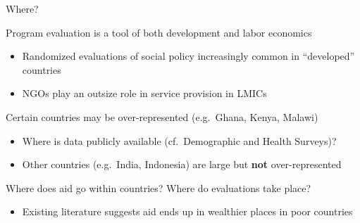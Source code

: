 \documentclass[10pt,xcolor=table,ignorenonframetext,handout,aspectratio=169]{beamer}
\newlength{\wideitemsep}
\let\olditem\item
\renewcommand{\item}{\setlength{\itemsep}{\wideitemsep}\olditem}
\begin{document}

\begin{frame}{Where?}

\medskip
Program evaluation is a tool of both development and labor economics

\medskip
\begin{itemize}
	
	\item Randomized evaluations of social policy increasingly common in ``developed'' countries
	
	\item NGOs play an outsize role in service provision in LMICs
	
\end{itemize}

\pause
\medskip
\medskip
Certain countries may be over-represented (e.g.~Ghana, Kenya, Malawi)

\medskip
\begin{itemize}
	
	\item Where is data publicly available (cf.~Demographic and Health Surveys)?
	
	\item Other countries (e.g.~India, Indonesia) are large but \textbf{not} over-represented 
	
\end{itemize}

\pause
\medskip
\medskip
Where does aid go within countries?  Where do evaluations take place?

\medskip
\begin{itemize}
	
	\item Existing literature suggests aid ends up in wealthier places in poor countries
	
\end{itemize}

\end{frame}



\end{document}
